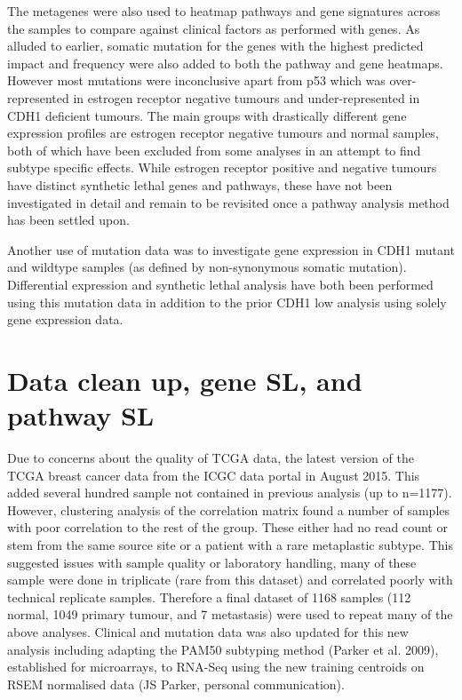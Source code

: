 The metagenes were also used to heatmap pathways and gene signatures across the samples to compare against clinical factors as performed with genes. As alluded to earlier, somatic mutation for the genes with the highest predicted impact and frequency were also added to both the pathway and gene heatmaps. However most mutations were inconclusive apart from p53 which was over-represented in estrogen receptor negative tumours and under-represented in CDH1 deficient tumours. The main groups with drastically different gene expression profiles are estrogen receptor negative tumours and normal samples, both of which have been excluded from some analyses in an attempt to find subtype specific effects.  While estrogen receptor positive and negative tumours have distinct synthetic lethal genes and pathways, these have not been investigated in detail and remain to be revisited once a pathway analysis method has been settled upon.

Another use of mutation data was to investigate gene expression in CDH1 mutant and wildtype samples (as defined by non-synonymous somatic mutation). Differential expression and synthetic lethal analysis have both been performed using this mutation data in addition to the prior CDH1 low analysis using solely gene expression data. 

\section{Data clean up, gene SL, and pathway SL}

Due to concerns about the quality of TCGA data, the latest version of the TCGA breast cancer data from the ICGC data portal in August 2015. This added several hundred sample not contained in previous analysis (up to n=1177). However, clustering analysis of the correlation matrix found a number of samples with poor correlation to the rest of the group. These either had no read count or stem from the same source site or a patient with a rare metaplastic subtype. This suggested issues with sample quality or laboratory handling, many of these sample were done in triplicate (rare from this dataset) and correlated poorly with technical replicate samples. Therefore a final dataset of 1168 samples (112 normal, 1049 primary tumour, and 7 metastasis) were used to repeat many of the above analyses. Clinical and mutation data was also updated for this new analysis including adapting the PAM50 subtyping method (Parker et al. 2009), established for microarrays, to RNA-Seq using the new training centroids on RSEM normalised data (JS Parker, personal communication).

